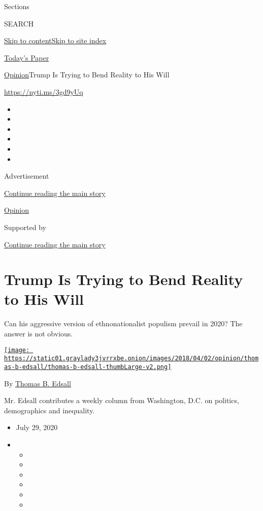 Sections

SEARCH

\protect\hyperlink{site-content}{Skip to
content}\protect\hyperlink{site-index}{Skip to site index}

\href{https://myaccount.nytimes3xbfgragh.onion/auth/login?response_type=cookie\&client_id=vi}{}

\href{https://www.nytimes3xbfgragh.onion/section/todayspaper}{Today's
Paper}

\href{/section/opinion}{Opinion}\textbar{}Trump Is Trying to Bend
Reality to His Will

\url{https://nyti.ms/3gd9yUq}

\begin{itemize}
\item
\item
\item
\item
\item
\item
\end{itemize}

Advertisement

\protect\hyperlink{after-top}{Continue reading the main story}

\href{/section/opinion}{Opinion}

Supported by

\protect\hyperlink{after-sponsor}{Continue reading the main story}

\hypertarget{trump-is-trying-to-bend-reality-to-his-will}{%
\section{Trump Is Trying to Bend Reality to His
Will}\label{trump-is-trying-to-bend-reality-to-his-will}}

Can his aggressive version of ethnonationalist populism prevail in 2020?
The answer is not obvious.

\href{https://www.nytimes3xbfgragh.onion/by/thomas-b-edsall}{\texttt{[image: https://static01.graylady3jvrrxbe.onion/images/2018/04/02/opinion/thomas-b-edsall/thomas-b-edsall-thumbLarge-v2.png]}}

By \href{https://www.nytimes3xbfgragh.onion/by/thomas-b-edsall}{Thomas
B. Edsall}

Mr. Edsall contributes a weekly column from Washington, D.C. on
politics, demographics and inequality.

\begin{itemize}
\item
  July 29, 2020
\item
  \begin{itemize}
  \item
  \item
  \item
  \item
  \item
  \item
  \end{itemize}
\end{itemize}

